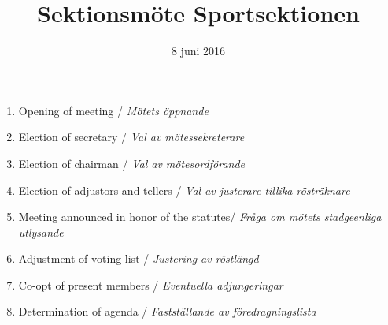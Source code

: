 \documentclass[12pt,a4paper]{article}
\begin{document}
	\title{\Huge Sektionsmöte Sportsektionen}
	\date{8 juni 2016}
	\maketitle

	\null
	\vfill

	\clearpage

	\begin{enumerate}

		\item Opening of meeting / \emph{Mötets öppnande}
		\item Election of secretary / \emph{Val av mötessekreterare}
		\item Election of chairman / \emph{Val av mötesordförande}
		\item Election of adjustors and tellers / \emph{Val av justerare tillika rösträknare}
		\item Meeting announced in honor of the statutes/ \emph{Fråga om mötets stadgeenliga utlysande}
		\item Adjustment of voting list / \emph{Justering av röstlängd}
		\item Co-opt of present members / \emph{Eventuella adjungeringar}
		\item Determination of agenda / \emph{Fastställande av föredragningslista}


\end{enumerate}
\end{document}
